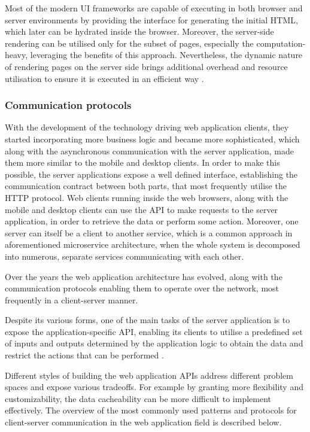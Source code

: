 Most of the modern UI frameworks are capable of executing in both browser and server environments by providing the interface for generating the initial HTML, which later can be hydrated inside the browser. Moreover, the server-side rendering can be utilised only for the subset of pages, especially the computation-heavy, leveraging the benefits of this approach. Nevertheless, the dynamic nature of rendering pages on the server side brings additional overhead and resource utilisation to ensure it is executed in an efficient way \cite{GoogleRenderingOnTheWeb}.

\subsubsection{Communication protocols}

With the development of the technology driving web application clients, they started incorporating more business logic and became more sophisticated, which along with the asynchronous communication with the server application, made them more similar to the mobile and desktop clients. In order to make this possible, the server applications expose a well defined interface, establishing the communication contract between both parts, that most frequently utilise the HTTP protocol. Web clients running inside the web browsers, along with the mobile and desktop clients can use the API to make requests to the server application, in order to retrieve the data or perform some action. Moreover, one server can itself be a client to another service, which is a common approach in aforementioned microservice architecture, when the whole system is decomposed into numerous, separate services communicating with each other.

Over the years the web application architecture has evolved, along with the communication protocols enabling them to operate over the network, most frequently in a client-server manner. 


Despite its various forms, one of the main tasks of the server application is to expose the application-specific API, enabling its clients to utilise a predefined set of inputs and outputs determined by the application logic to obtain the data and restrict the actions that can be performed \cite{DesignDataIntensiveApplications}.

Different styles of building the web application APIs address different problem spaces and expose various tradeoffs. For example by granting more flexibility and customizability, the data cacheability can be more difficult to implement effectively.
The overview of the most commonly used patterns and protocols for client-server communication in the web application field is described below.

